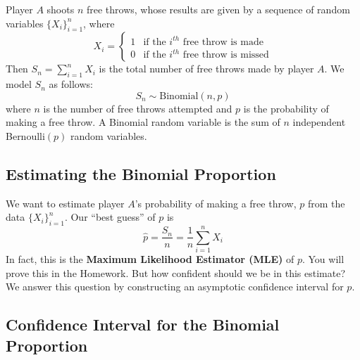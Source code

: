 \documentclass[twoside]{article}
\theoremstyle{definition}
\begin{document}
Player $A$ shoots $n$ free throws, whose results are given by a sequence of random variables $\{X_i\}_{i=1}^n$, where
\begin{equation}
   X_i = \begin{cases}
      1 & \text{if the $i^{th}$ free throw is made} \\
      0 & \text{if the $i^{th}$ free throw is missed}
   \end{cases}
\end{equation}
Then $S_n = \sum_{i=1}^n X_i$ is the total number of free throws made by player $A$. We model $S_n$ as follows:
\begin{equation}
   S_n \sim \text{Binomial}(n, p)
\end{equation}
where $n$ is the number of free throws attempted and $p$ is the probability of making a free throw. A Binomial random variable is the sum of $n$ independent Bernoulli$(p)$ random variables.

\subsection{Estimating the Binomial Proportion}

We want to estimate player $A$'s probability of making a free throw, $p$ from the data $\{X_i\}_{i=1}^n$. Our ``best guess'' of $p$ is
\begin{equation}
   \widehat{p} = \frac{S_n}{n} = \frac{1}{n} \sum_{i=1}^n X_i
\end{equation}
In fact, this is the \textbf{Maximum Likelihood Estimator (MLE)} of $p$. You will prove this in the Homework. But how confident should we be in this estimate? We answer this question by constructing an asymptotic confidence interval for $p$.

\subsection{Confidence Interval for the Binomial Proportion}
\end{document}

